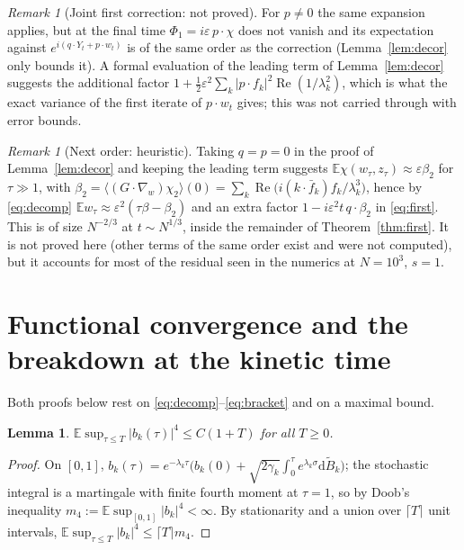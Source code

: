 \documentclass[11pt]{article}
\newcommand{\dd}{\mathrm{d}}
\newcommand{\E}{\mathbb{E}}
\newcommand{\eps}{\varepsilon}
\renewcommand{\Re}{\operatorname{Re}}
\newcommand{\avg}[1]{\langle #1\rangle}
\newtheorem{lemma}[theorem]{Lemma}
\theoremstyle{remark}
\newtheorem{remark}[theorem]{Remark}
\begin{document}
\begin{remark}[Joint first correction: not proved]\label{rem:jointcorr}
For $p\ne0$ the same expansion applies, but at the final time
$\Phi_1 = i\eps\,p\cdot\chi$ does not vanish and its expectation against
$e^{i(q\cdot Y_t+p\cdot w_t)}$ is of the same order as the correction
(Lemma~\ref{lem:decor} only bounds it). A formal evaluation of the leading
term of Lemma~\ref{lem:decor} suggests the additional factor
$1 + \tfrac12\eps^2\sum_k|p\cdot f_k|^2\Re(1/\lambda_k^2)$, which is what the
exact variance of the first iterate of $p\cdot w_t$ gives; this was not
carried through with error bounds.
\end{remark}

\begin{remark}[Next order: heuristic]\label{rem:offset}
Taking $q=p=0$ in the proof of Lemma~\ref{lem:decor} and keeping the leading
term suggests $\E\chi(w_\tau,z_\tau)\approx\eps\beta_2$ for $\tau\gg1$, with
$\beta_2 = \avg{(G\cdot\nabla_w)\chi_2}(0)
= \sum_k\Re\bigl(i(k\cdot\bar f_k)f_k/\lambda_k^3\bigr)$, hence by
\eqref{eq:decomp} $\E w_\tau\approx\eps^2(\tau\beta-\beta_2)$ and an extra
factor $1 - i\eps^2t\,q\cdot\beta_2$ in \eqref{eq:first}. This is of size
$N^{-2/3}$ at $t\sim N^{1/3}$, inside the remainder of
Theorem~\ref{thm:first}. It is not proved here (other terms of the same order
exist and were not computed), but it accounts for most of the residual seen
in the numerics at $N=10^3$, $s=1$.
\end{remark}

\section{Functional convergence and the breakdown at the kinetic time}

Both proofs below rest on \eqref{eq:decomp}--\eqref{eq:bracket} and on a
maximal bound.

\begin{lemma}\label{lem:max}
$\E\sup_{\tau\le T}|b_k(\tau)|^4\le C(1+T)$ for all $T\ge0$.
\end{lemma}

\begin{proof}
On $[0,1]$,
$b_k(\tau) = e^{-\lambda_k\tau}\bigl(b_k(0) + \sqrt{2\gamma_k}\int_0^\tau
e^{\lambda_k\sigma}\dd\tilde B_k\bigr)$; the stochastic integral is a
martingale with finite fourth moment at $\tau=1$, so by Doob's inequality
$m_4 := \E\sup_{[0,1]}|b_k|^4<\infty$. By stationarity and a union over
$\lceil T\rceil$ unit intervals, $\E\sup_{\tau\le T}|b_k|^4\le\lceil T\rceil m_4$.
\end{proof}
\end{document}
